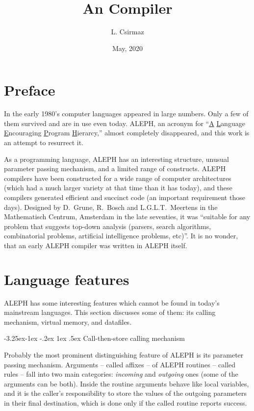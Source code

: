 \documentclass{article}
\title{{An \A} Compiler}
\author{L. Csirmaz}
\date{May, 2020}
\makeatletter
\newcommand\A{{\sf ALEPH}}
\newcommand\g[1]{{\sf #1}}
\renewcommand\subsection{%
\@startsection{subsection}{2}{\z@}%
   {-3.25ex\@plus -1ex \@minus -.2ex}%
   {1ex \@plus .5ex}%
   {\normalfont\normalsize\bfseries}}
\makeatother
\begin{document}
\maketitle

\section{Preface}

In the early 1980's computer languages appeared in large numbers. Only a few
of them survived and are in use even today. \A, an acronym for 
``\underline{\sf A} \underline{\sf L}anguage
\underline{\sf E}ncouraging \underline{\sf P}rogram \underline{\sf
H}ierarcy,'' almost completely disappeared, and this work is an attempt to
resurrect it.

As a programming language, \A{} has an interesting structure, unusual
parameter passing mechanism, and a limited range of constructs. \A{} compilers
have been constructed for a wide range of computer architectures (which had
a much larger variety at that time than it has today), and these compilers
generated efficient and
succinct code (an important requirement those days). Designed by D.~Grune,
R.~Bosch and L.G.L.T.~Meertens in the Mathematisch Centrum, Amsterdam in the
late seventies, it was ``suitable for any problem that suggests top-down
analysis (parsers, search algorithms, combinatorial problems, artificial
intelligence problems, etc)''. It is no wonder, that an early \A{} compiler
was written in \A{} itself.


\section{Language features}

\A{} has some interesting features which cannot be found in today's
mainstream languages. This section discusses some of them: its calling
mechanism, virtual memory, and datafiles.

\subsection{Call-then-store calling mechanism}\label{subsec:calling}

Probably the most prominent distinguishing feature of \A{}
is its parameter passing mechanism. Arguments -- called \g{affix}es -- 
of \A{} routines -- called \g{rules} -- fall into two main categories:
\emph{incoming} and \emph{outgoing} ones (some of the arguments can be both).
Inside the routine arguments behave like
local variables, and it is the caller's responsibility to store the values
of the outgoing
parameters in their final destination, which is done only if the
called routine reports success.
\end{document}
